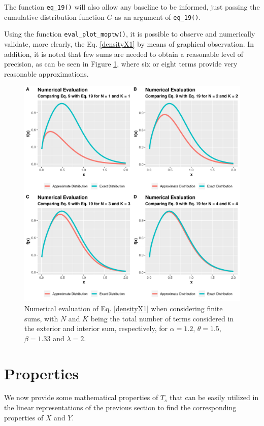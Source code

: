 \documentclass[12pt]{article}
\begin{document}
The function \texttt{eq\_19()} will also allow any baseline to be informed, just passing the cumulative distribution function $G$ as an argument of \texttt{eq\_19()}.

Using the function \texttt{eval\_plot\_moptw()}, it is possible to observe and numerically validate, more clearly, the Eq. \ref{densityX1} by means of graphical observation. In addition, it is noted that few sums are needed to obtain a reasonable level of precision, as can be seen in Figure \ref{fig:numerical}, where six or eight terms provide very reasonable approximations.

\begin{figure}[H]\label{fig:numerical}
\centering
\includegraphics[scale = 0.7]{numerical_evaluation.png}
\caption{Numerical evaluation of Eq. \ref{densityX1} when considering finite sums, with $N$ and $K$ being the total number of terms considered in the exterior and interior sum, respectively, for $\alpha = 1.2$, $\theta = 1.5$, $\beta = 1.33$ and $\lambda = 2$.}
\end{figure}

\section{Properties}\label{gen_proper}


We now provide some mathematical properties of $T_s$ that can be easily utilized in the linear representations of the previous
section to find the corresponding properties of $X$ and $Y$.
\end{document}
